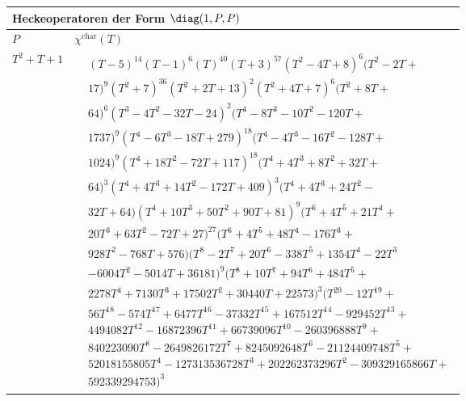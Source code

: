 \begin{tabular}{| l | l |}
\multicolumn{2}{l}{\bf Heckeoperatoren der Form $\diag(1,P,P)$} \\
\hline
$P$ & $\chi^\text{char}(T)$ \\
\hline
$T^2 + T + 1$ &
$\!\begin{aligned}
	&(T - 5)^{14}(T - 1)^{6}(T)^{40}(T + 3)^{57}(T^{2} - 4T + 8)^{6}(T^{2} - 2T + \\&
17)^{9}(T^{2} + 7)^{36}(T^{2} + 2T + 13)^{2}(T^{2} + 4T + 7)^{6}(T^{2} + 8T + \\&
64)^{6}(T^{3} - 4T^{2} - 32T - 24)^{2}(T^{4} - 8T^{3} - 10T^{2} - 120T + \\&
1737)^{9}(T^{4} - 6T^{3} - 18T + 279)^{18}(T^{4} - 4T^{3} - 16T^{2} - 128T + \\&
1024)^{9}(T^{4} + 18T^{2} - 72T + 117)^{18}(T^{4} + 4T^{3} + 8T^{2} + 32T + \\&
64)^{3}(T^{4} + 4T^{3} + 14T^{2} - 172T + 409)^{3}(T^{4} + 4T^{3} + 24T^{2} - \\&
32T + 64)(T^{4} + 10T^{3} + 50T^{2} + 90T + 81)^{9}(T^{6} + 4T^{5} + 21T^{4} + \\&
20T^{3} + 63T^{2} - 72T + 27)^{27}(T^{6} + 4T^{5} + 48T^{4} - 176T^{3} + \\&
928T^{2} - 768T + 576)(T^{8} - 2T^{7} + 20T^{6} - 338T^{5} + 1354T^{4} - 22T^{3}\\&
- 6004T^{2} - 5014T + 36181)^{9}(T^{8} + 10T^{7} + 94T^{6} + 484T^{5} + \\&
2278T^{4} + 7130T^{3} + 17502T^{2} + 30440T + 22573)^{3}(T^{20} - 12T^{19} + \\&
56T^{18} - 574T^{17} + 6477T^{16} - 37332T^{15} + 167512T^{14} - 929452T^{13} + \\&
4494082T^{12} - 16872396T^{11} + 66739096T^{10} - 260396888T^{9} + \\&
840223090T^{8} - 2649826172T^{7} + 8245092648T^{6} - 21124409748T^{5} + \\&
52018155805T^{4} - 127313536728T^{3} + 202262373296T^{2} - 309329165866T + \\&
592339294753)^{3}\end{aligned}$ \\
\hline
\end{tabular}


